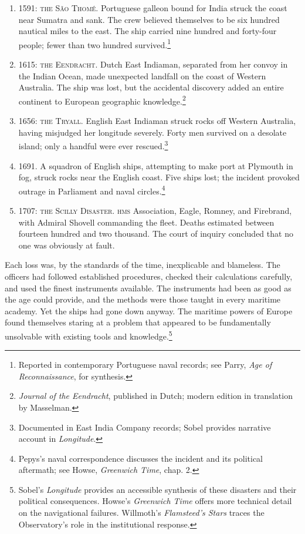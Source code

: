 \begin{enumerate}
  \item \textsc{1591: the São Thomé.} Portuguese galleon bound for India struck the coast near Sumatra and sank. The crew believed themselves to be six hundred nautical miles to the east. The ship carried nine hundred and forty-four people; fewer than two hundred survived.\footnote{Reported in contemporary Portuguese naval records; see Parry, \emph{Age of Reconnaissance}, for synthesis.}
  
  \item \textsc{1615: the Eendracht.} Dutch East Indiaman, separated from her convoy in the Indian Ocean, made unexpected landfall on the coast of Western Australia. The ship was lost, but the accidental discovery added an entire continent to European geographic knowledge.\footnote{\emph{Journal of the Eendracht}, published in Dutch; modern edition in translation by Masselman.}
  
  \item \textsc{1656: the Tryall.} English East Indiaman struck rocks off Western Australia, having misjudged her longitude severely. Forty men survived on a desolate island; only a handful were ever rescued.\footnote{Documented in East India Company records; Sobel provides narrative account in \emph{Longitude}.}
  
  \item \textsc{1691.} A squadron of English ships, attempting to make port at Plymouth in fog, struck rocks near the English coast. Five ships lost; the incident provoked outrage in Parliament and naval circles.\footnote{Pepys's naval correspondence discusses the incident and its political aftermath; see Howse, \emph{Greenwich Time}, chap. 2.}
  
  \item \textsc{1707: the Scilly Disaster.} \textsc{hms} Association, Eagle, Romney, and Firebrand, with Admiral Shovell commanding the fleet. Deaths estimated between fourteen hundred and two thousand. The court of inquiry concluded that no one was obviously at fault.
\end{enumerate}

Each loss was, by the standards of the time, inexplicable and blameless. The officers had followed established procedures, checked their calculations carefully, and used the finest instruments available. The instruments had been as good as the age could provide, and the methods were those taught in every maritime academy. Yet the ships had gone down anyway. The maritime powers of Europe found themselves staring at a problem that appeared to be fundamentally unsolvable with existing tools and knowledge.\footnote{Sobel's \emph{Longitude} provides an accessible synthesis of these disasters and their political consequences. Howse's \emph{Greenwich Time} offers more technical detail on the navigational failures. Willmoth's \emph{Flamsteed's Stars} traces the Observatory's role in the institutional response.}


